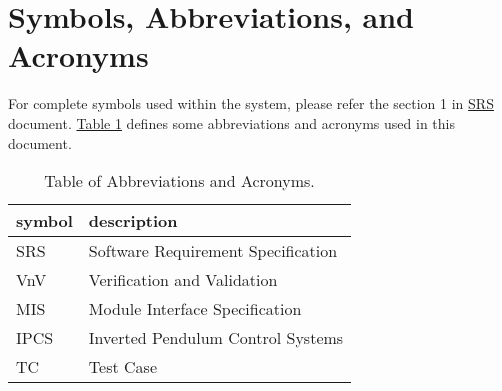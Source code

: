 \documentclass[12pt, titlepage]{article}
\begin{document}
\newpage

\section{Symbols, Abbreviations, and Acronyms}

For complete symbols used within the system, please refer the section 1 in
\href{https://github.com/mirzaim/ipcs/blob/main/docs/SRS/SRS.pdf}{SRS} document.
\hyperref[table_abb]{Table \ref*{table_abb}} defines some
abbreviations and acronyms used in this document.


\begin{table}[!h]
  \centering
  \caption{Table of Abbreviations and Acronyms.}
  \renewcommand{\arraystretch}{1.2}
  \begin{tabular}{l l}
    \toprule
    \textbf{symbol} & \textbf{description}               \\
    \midrule
    SRS             & Software Requirement Specification \\
    VnV             & Verification and Validation        \\
    MIS             & Module Interface Specification     \\
    IPCS            & Inverted Pendulum Control Systems  \\
    TC              & Test Case                          \\
    \bottomrule
  \end{tabular}\\
  \label{table_abb}
\end{table}

\end{document}
